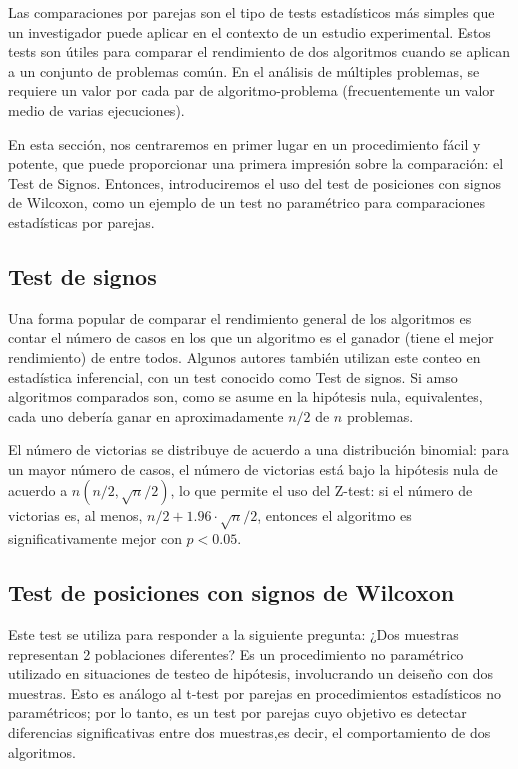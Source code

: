 Las comparaciones por parejas son el tipo de tests estadísticos más simples que un investigador puede aplicar en el contexto de un estudio experimental. 
Estos tests son útiles para comparar el rendimiento de dos algoritmos cuando se aplican a un conjunto de problemas común. 
En el análisis de múltiples problemas, se requiere un valor por cada par de algoritmo-problema (frecuentemente un valor medio de varias ejecuciones). 

En esta sección, nos centraremos en primer lugar en un procedimiento fácil y potente, que puede proporcionar una primera impresión sobre la comparación: el Test de Signos. 
Entonces, introduciremos el uso del test de posiciones con signos de Wilcoxon, como un ejemplo de un test no paramétrico para comparaciones estadísticas por parejas. 

\subsection{Test de signos}

Una forma popular de comparar el rendimiento general de los algoritmos es contar el número de casos en los que un algoritmo es el ganador (tiene el mejor rendimiento) de entre todos. 
Algunos autores también utilizan este conteo en estadística inferencial, con un test conocido como Test de signos. 
Si amso algoritmos comparados son, como se asume en la hipótesis nula, equivalentes, cada uno debería ganar en aproximadamente $n/2$ de $n$ problemas. 

El número de victorias se distribuye de acuerdo a una distribución binomial: para un mayor número de casos, el número de victorias está bajo la hipótesis nula de acuerdo a $n(n/2, \sqrt{n}/2)$, lo que permite el uso del Z-test: si el número de victorias es, al menos, $n/2 + 1.96\cdot \sqrt{n}/2$, entonces el algoritmo es significativamente mejor con $p < 0.05$. 

\subsection{Test de posiciones con signos de Wilcoxon}

Este test se utiliza para responder a la siguiente pregunta: ¿Dos muestras representan 2 poblaciones diferentes? 
Es un procedimiento no paramétrico utilizado en situaciones de testeo de hipótesis, involucrando un deiseño con dos muestras. 
Esto es análogo al t-test por parejas en procedimientos estadísticos no paramétricos; por lo tanto, es un test por parejas cuyo objetivo es detectar diferencias significativas entre dos  muestras,es decir, el comportamiento de dos algoritmos. 

